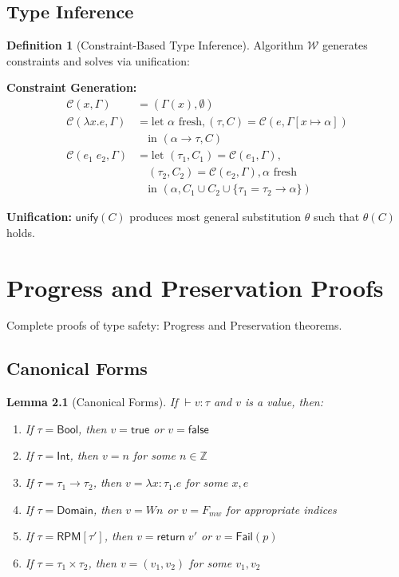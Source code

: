 \documentclass[11pt,twoside,openright]{book}
\theoremstyle{definition}
\newtheorem{definition}{Definition}[chapter]
\theoremstyle{plain}
\newtheorem{lemma}[definition]{Lemma}
\theoremstyle{remark}
\newcommand{\rpmret}{\mathsf{return}}
\newcommand{\Failed}{\mathsf{Fail}}
\newcommand{\vnew}{\textcolor{blue!70!black}{\textbf{[NEW v7.0]}}}
\begin{document}
\section{Type Inference}

\begin{definition}[Constraint-Based Type Inference]
\label{def:type-inference}
Algorithm $\mathcal{W}$ generates constraints and solves via unification:

\textbf{Constraint Generation:}
\begin{align}
\mathcal{C}(x, \Gamma) &= (\Gamma(x), \emptyset) \\
\mathcal{C}(\lambda x. e, \Gamma) &= \text{let } \alpha \text{ fresh}, (\tau, C) = \mathcal{C}(e, \Gamma[x \mapsto \alpha]) \\
&\quad \text{in } (\alpha \to \tau, C) \\
\mathcal{C}(e_1\; e_2, \Gamma) &= \text{let } (\tau_1, C_1) = \mathcal{C}(e_1, \Gamma), \\
&\quad (\tau_2, C_2) = \mathcal{C}(e_2, \Gamma), \alpha \text{ fresh} \\
&\quad \text{in } (\alpha, C_1 \cup C_2 \cup \{\tau_1 = \tau_2 \to \alpha\})
\end{align}

\textbf{Unification:}
$\mathsf{unify}(C)$ produces most general substitution $\theta$ such that $\theta(C)$ holds.
\end{definition}

\chapter{Progress and Preservation Proofs}
\label{ch:type-proofs}

\begin{tcolorbox}[colback=blue!5!white,colframe=blue!75!black,title=\vnew]
Complete proofs of type safety: Progress and Preservation theorems.
\end{tcolorbox}

\section{Canonical Forms}

\begin{lemma}[Canonical Forms]
\label{lem:canonical}
If $\vdash v : \tau$ and $v$ is a value, then:
\begin{enumerate}
  \item If $\tau = \mathsf{Bool}$, then $v = \mathsf{true}$ or $v = \mathsf{false}$
  \item If $\tau = \mathsf{Int}$, then $v = n$ for some $n \in \mathbb{Z}$
  \item If $\tau = \tau_1 \to \tau_2$, then $v = \lambda x:\tau_1. e$ for some $x, e$
  \item If $\tau = \mathsf{Domain}$, then $v = Wn$ or $v = F_{mw}$ for appropriate indices
  \item If $\tau = \mathsf{RPM}[\tau']$, then $v = \rpmret\; v'$ or $v = \Failed(p)$
  \item If $\tau = \tau_1 \times \tau_2$, then $v = (v_1, v_2)$ for some $v_1, v_2$
\end{enumerate}
\end{lemma}
\end{document}
